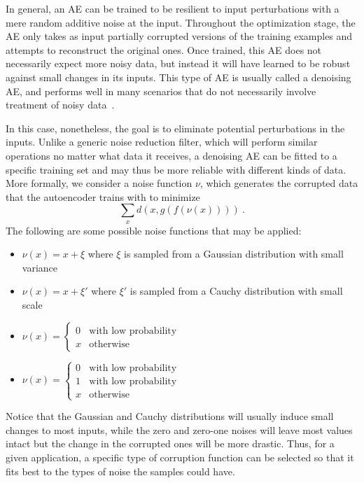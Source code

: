 In general, an AE can be trained to be resilient to input perturbations with a  mere random additive noise at the input. Throughout the optimization stage, the AE only takes as input partially corrupted versions of the training examples and attempts to reconstruct the original ones. Once trained, this AE does not necessarily expect more noisy data, but instead it will have learned to be robust against small changes in its inputs. This type of AE is usually called a denoising AE, and performs well in many scenarios that do not necessarily involve treatment of noisy data~\cite{sdae}.

In this case, nonetheless, the goal is to eliminate potential perturbations in the inputs. Unlike a generic noise reduction filter, which will perform similar operations no matter what data it receives, a denoising AE can be fitted to a specific training set and may thus be more reliable with different kinds of data. More formally, we consider a noise function $\nu$, which generates the corrupted data that the autoencoder trains with to minimize \[\sum_x d(x, g(f(\nu(x))))~.\] The following are some possible noise functions that may be applied:

\begin{itemize}
    \item $\nu(x)=x+\xi$ where $\xi$ is sampled from a Gaussian distribution with small variance
    \item $\nu(x)=x+\xi'$ where $\xi'$ is sampled from a Cauchy distribution with small scale
    \item $\nu(x)=\begin{cases}
        0&\mbox{with low probability}\\x&\mbox{otherwise}
    \end{cases}$
    \item $\nu(x)=\begin{cases}
        0&\mbox{with low probability}\\1&\mbox{with low probability}\\x&\mbox{otherwise}
    \end{cases}$
\end{itemize}

Notice that the Gaussian and Cauchy distributions will usually induce small changes to most inputs, while the zero and zero-one noises will leave most values intact but the change in the corrupted ones will be more drastic. Thus, for a given application, a specific type of corruption function can be selected so that it fits best to the types of noise the samples could have.

